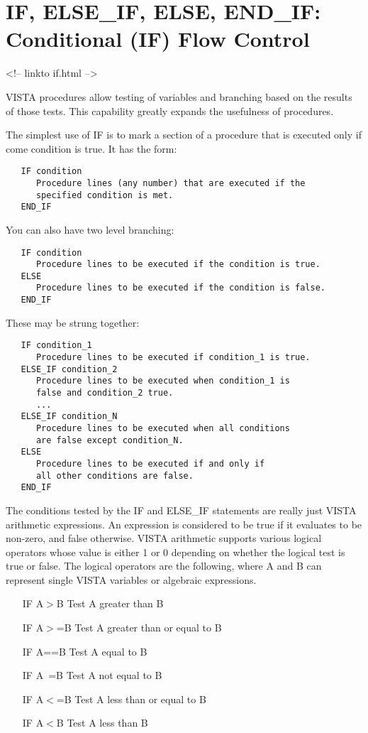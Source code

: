 \section{IF, ELSE\_IF, ELSE, END\_IF: Conditional (IF) Flow Control}
\begin{rawhtml}
<!-- linkto if.html -->
\end{rawhtml}


VISTA procedures allow testing of variables and branching based on the
results of those tests.  This capability greatly expands the usefulness of
procedures.

The simplest use of IF is to mark a section of a procedure that is executed
only if come condition is true.  It has the form:
\begin{verbatim}
   IF condition
      Procedure lines (any number) that are executed if the
      specified condition is met.
   END_IF
\end{verbatim}

You can also have two level branching:
\begin{verbatim}
   IF condition
      Procedure lines to be executed if the condition is true.
   ELSE
      Procedure lines to be executed if the condition is false.
   END_IF
\end{verbatim}

These may be strung together:
\begin{verbatim}
   IF condition_1
      Procedure lines to be executed if condition_1 is true.
   ELSE_IF condition_2
      Procedure lines to be executed when condition_1 is
      false and condition_2 true.
      ...
   ELSE_IF condition_N
      Procedure lines to be executed when all conditions
      are false except condition_N.
   ELSE
      Procedure lines to be executed if and only if
      all other conditions are false.
   END_IF
\end{verbatim}

The conditions tested by the IF and ELSE\_IF statements are really just
VISTA arithmetic expressions.  An expression is considered to be true if it
evaluates to be non-zero, and false otherwise.  VISTA arithmetic supports
various logical operators whose value is either 1 or 0 depending on whether
the logical test is true or false.  The logical operators are the
following, where A and B can represent single VISTA variables or algebraic
expressions.
\begin{itemize}
  \item[IF A$>$B\hfill]{Test A greater than B}
  \item[IF A$>$=B\hfill]{Test A greater than or equal to B}
  \item[IF A==B\hfill]{Test A equal to B}
  \item[IF A~=B\hfill]{Test A not equal to B}
  \item[IF A$<$=B\hfill]{Test A less than or equal to B}
  \item[IF A$<$B\hfill]{Test A less than B}
\end{itemize}

